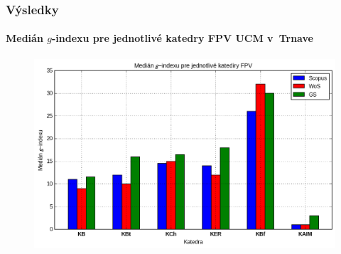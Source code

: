 \documentclass{beamer}
\begin{document}
\begin{frame}
  \frametitle{Výsledky}
  \framesubtitle{Medián $g$-indexu pre jednotlivé katedry FPV UCM v~Trnave}
  \begin{figure}
    \centering
    \includegraphics[scale=0.5]{plot-results-data-g_index.png}
  \end{figure}
\end{frame}
\end{document}

